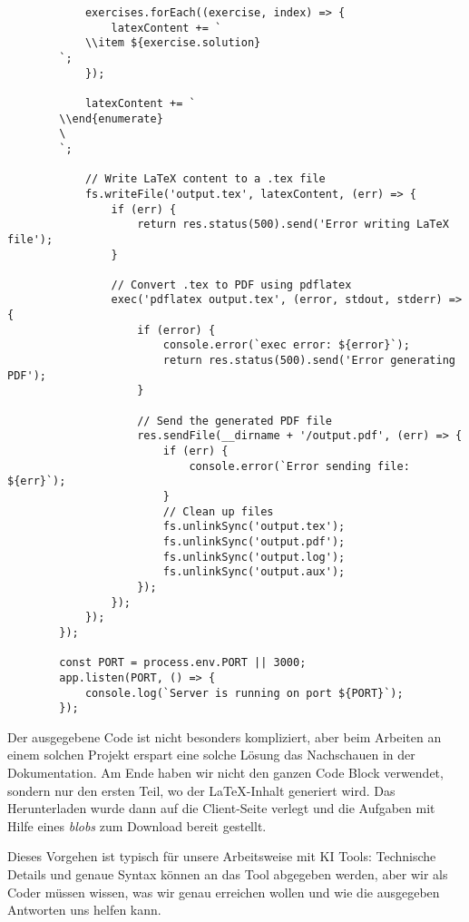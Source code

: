 \begin{description}
\begin{lstlisting}
            exercises.forEach((exercise, index) => {
                latexContent += `
            \\item ${exercise.solution}
        `;
            });
        
            latexContent += `
        \\end{enumerate}
        \
        `;
        
            // Write LaTeX content to a .tex file
            fs.writeFile('output.tex', latexContent, (err) => {
                if (err) {
                    return res.status(500).send('Error writing LaTeX file');
                }
        
                // Convert .tex to PDF using pdflatex
                exec('pdflatex output.tex', (error, stdout, stderr) => {
                    if (error) {
                        console.error(`exec error: ${error}`);
                        return res.status(500).send('Error generating PDF');
                    }
        
                    // Send the generated PDF file
                    res.sendFile(__dirname + '/output.pdf', (err) => {
                        if (err) {
                            console.error(`Error sending file: ${err}`);
                        }
                        // Clean up files
                        fs.unlinkSync('output.tex');
                        fs.unlinkSync('output.pdf');
                        fs.unlinkSync('output.log');
                        fs.unlinkSync('output.aux');
                    });
                });
            });
        });
        
        const PORT = process.env.PORT || 3000;
        app.listen(PORT, () => {
            console.log(`Server is running on port ${PORT}`);
        });
            \end{lstlisting}
\end{description}

Der ausgegebene Code ist nicht besonders kompliziert, aber beim Arbeiten an einem solchen Projekt erspart eine solche Lösung das Nachschauen in der Dokumentation. Am Ende haben wir nicht den ganzen Code Block verwendet, sondern nur den ersten Teil, wo der \LaTeX-Inhalt generiert wird. Das Herunterladen wurde dann auf die Client-Seite verlegt und die Aufgaben mit Hilfe eines \emph{blobs} zum Download bereit gestellt. 

Dieses Vorgehen ist typisch für unsere Arbeitsweise mit KI Tools: Technische Details und genaue Syntax können an das Tool abgegeben werden, aber wir als Coder müssen wissen, was wir genau erreichen wollen und wie die ausgegeben Antworten uns helfen kann.